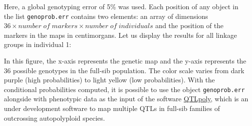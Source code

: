 \documentclass[
]{article}
\newenvironment{Shaded}{}{}
\newcommand{\ControlFlowTok}[1]{\textcolor[rgb]{0.00,0.44,0.13}{\textbf{#1}}}
\newcommand{\DataTypeTok}[1]{\textcolor[rgb]{0.56,0.13,0.00}{#1}}
\newcommand{\DecValTok}[1]{\textcolor[rgb]{0.25,0.63,0.44}{#1}}
\newcommand{\KeywordTok}[1]{\textcolor[rgb]{0.00,0.44,0.13}{\textbf{#1}}}
\newcommand{\NormalTok}[1]{#1}
\newcommand{\OperatorTok}[1]{\textcolor[rgb]{0.40,0.40,0.40}{#1}}
\newcommand{\OtherTok}[1]{\textcolor[rgb]{0.00,0.44,0.13}{#1}}
\newcommand{\StringTok}[1]{\textcolor[rgb]{0.25,0.44,0.63}{#1}}
\begin{document}
Here, a global genotyping error of 5\% was used. Each position of any
object in the list \texttt{genoprob.err} contains two elements: an array
of dimensions
\(36 \times number \; of \; markers \times number \; of \; individuals\)
and the position of the markers in the maps in centimorgans. Let us
display the results for all linkage groups in individual 1:

\begin{Shaded}
\end{Shaded}

In this figure, the x-axis represents the genetic map and the y-axis
represents the 36 possible genotypes in the full-sib population. The
color scale varies from dark purple (high probabilities) to light yellow
(low probabilities). With the conditional probabilities computed, it is
possible to use the object \texttt{genoprob.err} alongside with
phenotypic data as the input of the software
\href{https://github.com/guilherme-pereira/QTLpoly}{QTLpoly}, which is
an under development software to map multiple QTLs in full-sib families
of outcrossing autopolyploid species.
\end{document}
